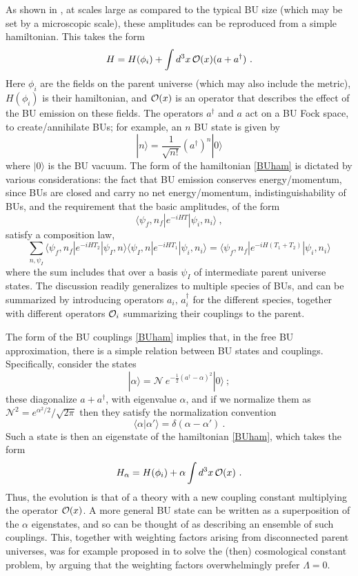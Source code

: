 \documentclass[12pt]{article}
\numberwithin{equation}{section}
\newcommand{\calo}{{\cal O}}
\newcommand{\beq}{\begin{equation}}
\newcommand{\eeq}{\end{equation}}
\begin{document}
As shown in \cite{Cole,GiStInc}, at scales large as compared to the typical BU size (which may be set by a microscopic scale), these amplitudes can be reproduced from a simple hamiltonian.  This takes the form
\beq\label{BUham}
H= H(\phi_i) + \int d^3x\, \calo(x) (a+a^\dagger)\ .
\eeq
Here $\phi_i$ are the fields on the parent universe (which may also include the metric), $H(\phi_i)$ is their hamiltonian, and $\calo(x)$ is an operator that describes the effect of the BU emission on these fields.  The operators $a^\dagger$ and $a$ act on a BU Fock space, to create/annihilate BUs; for example, an $n$ BU state
is given by
\beq
|n\rangle = \frac{1}{\sqrt{n!}} (a^\dagger)^n |0\rangle
\eeq
where $|0\rangle$ is the BU vacuum.  The form of the hamiltonian \eqref{BUham} is dictated by various considerations: the fact that BU emission conserves energy/momentum, since BUs are closed and carry no net energy/momentum, indistinguishability of BUs, and the requirement that the basic amplitudes, of the form
\beq
\langle \psi_f,n_f|e^{-i HT}|\psi_i,n_i\rangle\ ,
\eeq
satisfy a composition law,
\beq
\sum_{n, \psi_I}\langle\psi_f,n_f |e^{-iHT_2}|\psi_I,n\rangle\langle \psi_I,n|e^{-iHT_1}|\psi_i, n_i\rangle = \langle\psi_f,n_f |e^{-iH(T_1+T_2)}|\psi_i, n_i\rangle
\eeq
where the sum includes that over a basis $\psi_I$ of intermediate parent universe states.
The discussion readily generalizes to multiple species of BUs, and can be summarized by introducing operators $a_i,\, a^\dagger_i$ for the different species, together with different operators $\calo_i$ summarizing their couplings to the parent.

The  form of the BU couplings \eqref{BUham} implies that, in the free BU approximation, there is a simple relation between BU states and couplings.  Specifically, consider the states 
\beq
|\alpha\rangle = \mathcal{N}~e^{-\frac{1}{2}(a^\dagger - \alpha )^2} |0\rangle\ ;
\eeq
these diagonalize $a+a^\dagger$, with eigenvalue $\alpha$, and if we normalize them as $\mathcal{N}^2=e^{\alpha^2/2}/\sqrt{2\pi}$ then they satisfy the normalization convention
\beq
\langle \alpha|\alpha'\rangle = \delta(\alpha - \alpha')\ .
\eeq
Such a state is then an eigenstate of the hamiltonian  \eqref{BUham}, which takes the form
\beq
H_\alpha= H(\phi_i) + \alpha \int d^3x\, \calo(x)\ .
\eeq
Thus, the evolution is that of a theory with a new coupling constant multiplying the operator $\calo(x)$.  A more general BU state can be written as a superposition of the $\alpha$ eigenstates, and so can be thought of as describing an ensemble of such couplings.  This, together with weighting factors arising from disconnected parent universes, was for example proposed in \cite{ColeCC} to solve the (then) cosmological constant problem, by arguing that the weighting factors overwhelmingly prefer $\Lambda=0$.  
\end{document}
